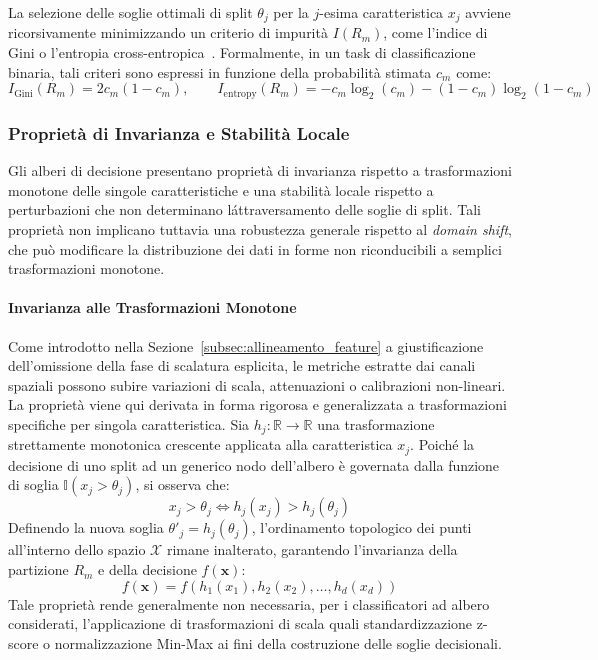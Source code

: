 La selezione delle soglie ottimali di split $\theta_j$ per la $j$-esima caratteristica $x_j$ avviene ricorsivamente minimizzando un criterio di impurità $I(R_m)$, come l'indice di Gini o l'entropia cross-entropica~\cite{breiman1984}. Formalmente, in un task di classificazione binaria, tali criteri sono espressi in funzione della probabilità stimata $c_m$ come:
\begin{equation}
    I_{\text{Gini}}(R_m) = 2c_m(1-c_m), \qquad I_{\text{entropy}}(R_m) = -c_m\log_2(c_m) - (1-c_m)\log_2(1-c_m)
\end{equation}

\subsubsection{Proprietà di Invarianza e Stabilità Locale}
Gli alberi di decisione presentano proprietà di invarianza rispetto a trasformazioni monotone delle singole caratteristiche e una stabilità locale rispetto a perturbazioni che non determinano l\'attraversamento delle soglie di split. Tali proprietà non implicano tuttavia una robustezza generale rispetto al \textit{domain shift}, che può modificare la distribuzione dei dati in forme non riconducibili a semplici trasformazioni monotone.

\paragraph{Invarianza alle Trasformazioni Monotone}
Come introdotto nella Sezione~\ref{subsec:allineamento_feature} a giustificazione dell'omissione della fase di scalatura esplicita, le metriche estratte dai canali spaziali possono subire variazioni di scala, attenuazioni o calibrazioni non-lineari. La proprietà viene qui derivata in forma rigorosa e generalizzata a trasformazioni specifiche per singola caratteristica. Sia $h_j: \mathbb{R} \to \mathbb{R}$ una trasformazione strettamente monotonica crescente applicata alla caratteristica $x_j$. Poiché la decisione di uno split ad un generico nodo dell'albero è governata dalla funzione di soglia $\mathbb{I}(x_j > \theta_j)$, si osserva che:
\begin{equation}
    x_j > \theta_j \iff h_j(x_j) > h_j(\theta_j)
\end{equation}
Definendo la nuova soglia $\theta'_j = h_j(\theta_j)$, l'ordinamento topologico dei punti all'interno dello spazio $\mathcal{X}$ rimane inalterato, garantendo l'invarianza della partizione $R_m$ e della decisione $f(\mathbf{x})$:
\begin{equation}
    f(\mathbf{x}) = f(h_1(x_1), h_2(x_2), \dots, h_d(x_d))
\end{equation}
Tale proprietà rende generalmente non necessaria, per i classificatori ad albero considerati, l'applicazione di trasformazioni di scala quali standardizzazione z-score o normalizzazione Min-Max ai fini della costruzione delle soglie decisionali.

